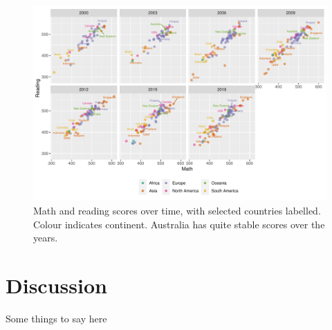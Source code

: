 \begin{Schunk}
\begin{figure}
\includegraphics[width=1\linewidth]{learningtower_files/figure-latex/facet-time-1} \caption[Math and reading scores over time, with selected countries labelled]{Math and reading scores over time, with selected countries labelled. Colour indicates continent. Australia has quite stable scores over the years.}\label{fig:facet-time}
\end{figure}
\end{Schunk}

\hypertarget{discussion}{%
\section{Discussion}\label{discussion}}

Some things to say here



\address{%
Priya Ravindra Dingorkar\\
Monash University\\%
Department of Econometrics and Business Statistics\\ Clayton,
Australia\\
%
\url{https://www.linkedin.com/in/priya-dingorkar/}\\%
%
\href{mailto:priyadingorkar@gmail.com}{\nolinkurl{priyadingorkar@gmail.com}}%
}

\address{%
Kevin Y.X. Wang\\
University of Sydney\\%
School of Mathematics and Statistics\\ Sydney, Australia\\
%
\url{https://kevinwang09.github.io/}\\%
%
\href{mailto:kevinwangstats@gmail.com}{\nolinkurl{kevinwangstats@gmail.com}}%
}

\address{%
Dianne Cook\\
Monash University\\%
Department of Econometrics and Business Statistics\\ Clayton,
Australia\\
%
\url{http://dicook.org/}\\%
%
\href{mailto:dicook@monash.edu}{\nolinkurl{dicook@monash.edu}}%
}
